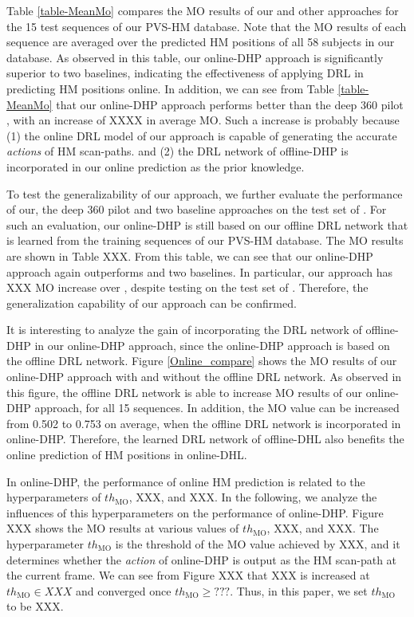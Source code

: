 \documentclass[10pt,journal,compsoc]{IEEEtran}
\begin{document}
Table \ref{table-MeanMo} compares the MO results of our and other approaches for the 15 test sequences of our PVS-HM database. Note that the MO results of each sequence are averaged over the predicted HM positions of all 58 subjects in our database. As observed in this table, our online-DHP approach is significantly superior to two baselines, indicating the effectiveness of applying DRL in predicting HM positions online.
In addition, we can see from Table \ref{table-MeanMo} that our online-DHP approach performs better than the deep 360 pilot \cite{hu2017deep}, with an increase of XXXX in average MO. Such a increase is probably because (1) the online DRL model of our approach is capable of generating the accurate \textit{actions} of HM scan-paths. and (2) the DRL network of offline-DHP is incorporated in our online prediction as the prior knowledge.

To test the generalizability of our approach, we further evaluate the performance of our, the deep 360 pilot \cite{hu2017deep} and two baseline approaches on the test set of \cite{hu2017deep}. For such an evaluation, our online-DHP is still based on our offline DRL network that is learned from the training sequences of our PVS-HM database. The MO results are shown in Table XXX. From this table, we can see that our online-DHP approach again outperforms \cite{hu2017deep} and two baselines. In particular, our approach has XXX MO increase over \cite{hu2017deep}, despite testing on the test set of \cite{hu2017deep}. Therefore, the generalization capability of our approach can be confirmed.

It is interesting to analyze the gain of incorporating the DRL network of offline-DHP in our online-DHP approach, since the online-DHP approach is based on the offline DRL network. Figure \ref{Online_compare} shows the MO results of our online-DHP approach with and without the offline DRL network. As observed in this figure, the offline DRL network is able to increase MO results of our online-DHP approach, for all 15 sequences. In addition, the MO value can be increased from 0.502 to 0.753 on average, when the offline DRL network is incorporated in online-DHP. Therefore, the learned DRL network of offline-DHL also benefits the online prediction of HM positions in online-DHL.

In online-DHP, the performance of online HM prediction is related to the hyperparameters of $th_{\text{MO}}$, XXX, and XXX. In the following, we analyze the influences of this hyperparameters on the performance of online-DHP. Figure XXX shows the MO results at various values of $th_{\text{MO}}$, XXX, and XXX. The hyperparameter $th_{\text{MO}}$ is the threshold of the MO value achieved by XXX, and it determines whether the \textit{action} of online-DHP is output as the HM scan-path at the current frame. We can see from Figure XXX that XXX is increased at $th_{\text{MO}}\in XXX$ and converged once $th_{\text{MO}}\geq???$. Thus, in this paper, we set $th_{\text{MO}}$ to be XXX.
\end{document}

